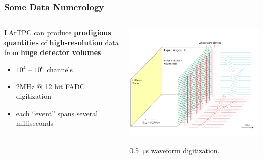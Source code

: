 \documentclass[xcolor=dvipsnames]{beamer}
\begin{document}
\begin{frame}
  \frametitle{Some Data Numerology}
  
  \vspace{-10mm}

  \begin{columns}
    \begin{column}{0.8\textwidth}
      LArTPC can produce \textbf{prodigious quantities} of \textbf{high-resolution} data from \textbf{huge detector volumes}:
      \begin{itemize}
      \item $10^4$ -- $10^6$ channels
      \item 2MHz @ 12 bit FADC digitization
      \item each ``event'' spans several milliseconds
      \end{itemize}
    \end{column}
    \begin{column}{0.2\textwidth}
      \begin{center}
        \includegraphics[width=\textwidth,trim=13cm 0cm 0cm 0cm,clip]{signal-15.png}

        \scriptsize \SI{0.5}{\micro\second} waveform digitization.
      \end{center}
    \end{column}
  \end{columns}

  \vspace{-5mm}


\end{frame}
\end{document}
